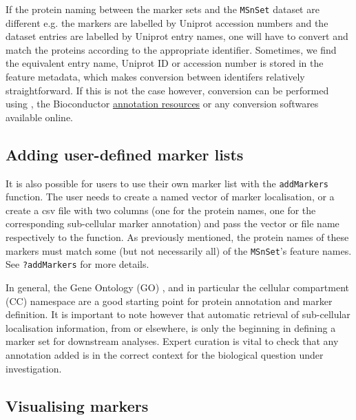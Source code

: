 If the protein naming between the marker sets and the \texttt{MSnSet}
dataset are different e.g. the markers are labelled by Uniprot
accession numbers and the dataset entries are labelled by Uniprot
entry names, one will have to convert and match the proteins according
to the appropriate identifier. Sometimes, we find the equivalent entry
name, Uniprot ID or accession number is stored in the feature
metadata, which makes conversion between identifers relatively
straightforward. If this is not the case however, conversion can be
performed using , the Bioconductor
\href{http://bioconductor.org/help/workflows/annotation/Annotation_Resources/}{annotation
  resources} or any conversion softwares available online.

\subsection*{Adding user-defined marker lists}
It is also possible for users to use their own marker list with the
\texttt{addMarkers} function. The user needs to create a named vector
of marker localisation, or a create a csv file with two columns (one
for the protein names, one for the corresponding sub-cellular marker
annotation) and pass the vector or file name respectively to the
function. As previously mentioned, the protein names of these markers
must match some (but not necessarily all) of the \texttt{MSnSet}'s
feature names. See \texttt{?addMarkers} for more details.

In general, the Gene Ontology (GO) \cite{Ashburner:2000}, and in
particular the cellular compartment (CC) namespace are a good starting
point for protein annotation and marker definition. It is important to
note however that automatic retrieval of sub-cellular localisation
information, from  or elsewhere, is only the
beginning in defining a marker set for downstream analyses. Expert
curation is vital to check that any annotation added is in the correct
context for the biological question under investigation.


\subsection*{Visualising markers}


